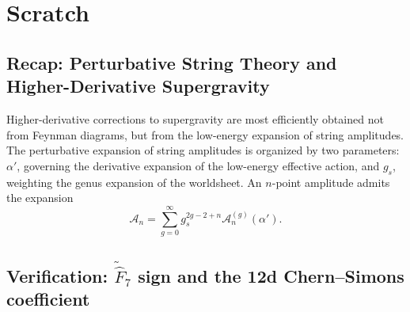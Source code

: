 

\section{Scratch}
\subsection{Recap: Perturbative String Theory and Higher-Derivative Supergravity}
Higher-derivative corrections to supergravity are most efficiently obtained not from Feynman diagrams, but from the low-energy expansion of string amplitudes.
The perturbative expansion of string amplitudes is organized by two parameters: $\alpha'$, governing the derivative expansion of the low-energy effective action, and $g_s$, weighting the genus expansion of the worldsheet. An $n$-point amplitude admits the expansion
\begin{equation}
    \mathcal A_n = \sum_{g=0}^\infty g_s^{2g-2+n}  \mathcal A_n^{(g)}(\alpha').
\end{equation}


\subsection*{Verification: $\tilde{\hat F}_7$ sign and the 12d Chern--Simons coefficient}

